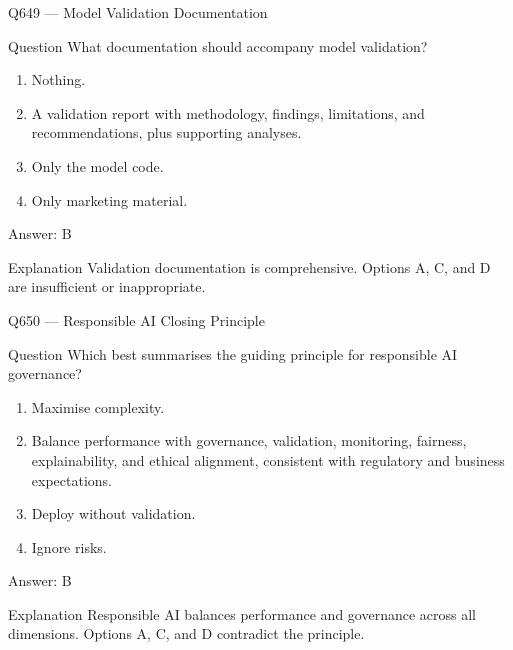 \documentclass[aspectratio=169,8pt]{beamer}
\begin{document}
	\begin{frame}{Q649 --- Model Validation Documentation}
		\begin{block}{Question}
			What documentation should accompany model validation?
			\begin{enumerate}
				\item Nothing.
				\item A validation report with methodology, findings, limitations, and recommendations, plus supporting analyses.
				\item Only the model code.
				\item Only marketing material.
			\end{enumerate}
		\end{block}
		\begin{exampleblock}{Answer: B}\end{exampleblock}
		\begin{block}{Explanation}
			Validation documentation is comprehensive. Options A, C, and D are insufficient or inappropriate.
		\end{block}
	\end{frame}
	
	\begin{frame}{Q650 --- Responsible AI Closing Principle}
		\begin{block}{Question}
			Which best summarises the guiding principle for responsible AI governance?
			\begin{enumerate}
				\item Maximise complexity.
				\item Balance performance with governance, validation, monitoring, fairness, explainability, and ethical alignment, consistent with regulatory and business expectations.
				\item Deploy without validation.
				\item Ignore risks.
			\end{enumerate}
		\end{block}
		\begin{exampleblock}{Answer: B}\end{exampleblock}
		\begin{block}{Explanation}
			Responsible AI balances performance and governance across all dimensions. Options A, C, and D contradict the principle.
		\end{block}
	\end{frame}
	
\end{document}
